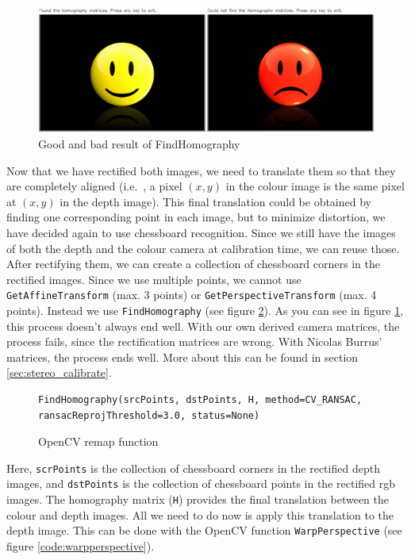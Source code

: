 \begin{figure}[H]
\centering
\includegraphics[scale=0.6]{images/homography.png}
\caption{Good and bad result of FindHomography}
\label{fig:homography}
\end{figure}

Now that we have rectified both images, we need to translate them so that they
are completely aligned (i.e.\ , a pixel $\left(x, y\right)$ in the colour image
is the same pixel at $\left(x, y\right)$ in the depth image). This final
translation could be obtained by finding one corresponding point in each image,
but to minimize distortion, we have decided again to use chessboard recognition.
Since we still have the images of both the depth and the colour camera at
calibration time, we can reuse those. After rectifying them, we can create a
collection of chessboard corners in the rectified images. Since we use multiple
points, we cannot use \verb|GetAffineTransform| (max. 3 points) or
\verb|GetPerspectiveTransform| (max. 4 points). Instead we use
\verb|FindHomography| (see figure \ref{code:findhomography}). As you can see in
figure \ref{fig:homography}, this process doesn't always end well. With our own
derived camera matrices, the process fails, since the rectification matrices are
wrong. With Nicolas Burrus' matrices, the process ends well. More about this
can be found in section \ref{sec:stereo_calibrate}.

\begin{figure}[H]
\begin{lstlisting}
FindHomography(srcPoints, dstPoints, H, method=CV_RANSAC, ransacReprojThreshold=3.0, status=None)
\end{lstlisting}
\caption{OpenCV remap function}
\label{code:findhomography}
\end{figure}

Here, \verb|scrPoints| is the collection of chessboard corners in the rectified
depth images, and \verb|dstPoints| is the collection of chessboard points in the
rectified rgb images. The homography matrix (\verb|H|) provides the final
translation between the colour and depth images. All we need to do now is apply
this translation to the depth image. This can be done with the OpenCV function
\verb|WarpPerspective| (see figure \ref{code:warpperspective}).

